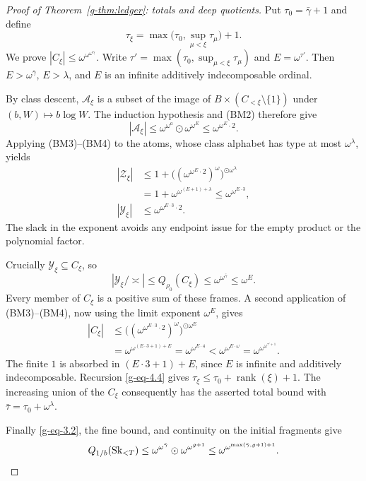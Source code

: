 \documentclass[11pt]{article}
\theoremstyle{definition}
\theoremstyle{remark}
\newcommand{\Sk}{\operatorname{Sk}}
\newcommand{\arch}{\mathrel{\asymp}}
\newcommand{\od}{\mathbin{\odot}}
\newcommand{\Acal}{\mathcal A}
\newcommand{\Ycal}{\mathcal Y}
\newcommand{\Zcal}{\mathcal Z}
\numberwithin{equation}{section}
\begin{document}
\begin{proof}[Proof of Theorem~\ref{g-thm:ledger}: totals and deep quotients]
Put $\tau_0=\bar\gamma+1$ and define
\begin{equation}
 \tau_\xi=\max\bigl(\tau_0,\sup_{\mu<\xi}\tau_\mu\bigr)+1.
 \label{g-eq-4.4}
\end{equation}
We prove $|C_\xi|\le\omega^{\omega^{\omega^{\tau_\xi}}}$.
Write $\tau'=\max(\tau_0,\sup_{\mu<\xi}\tau_\mu)$ and $E=\omega^{\tau'}$.
Then $E>\omega^{\bar\gamma}$, $E>\lambda$, and $E$ is an infinite
additively indecomposable ordinal.

By class descent, $\Acal_\xi$ is a subset of the image of
$B\times(C_{<\xi}\setminus\{1\})$ under $(b,W)\mapsto b\log W$.
The induction hypothesis and (BM2) therefore give
\[
 |\Acal_\xi|
 \le\omega^{\omega^a}\od\omega^{\omega^E}
 \le\omega^{\omega^E\cdot2}.
\]
Applying (BM3)--(BM4) to the atoms, whose class alphabet has type
at most $\omega^\lambda$, yields
\[
 \begin{aligned}
 |\Zcal_\xi|
 &\le1+\bigl((\omega^{\omega^E\cdot2})^\omega
                                 \bigr)^{\od\omega^\lambda}\\
 &=1+\omega^{\omega^{(E+1)+\lambda}}
 \le\omega^{\omega^{E\cdot3}},\\
 |\Ycal_\xi|&\le\omega^{\omega^{E\cdot3}\cdot2}.
 \end{aligned}
\]
The slack in the exponent avoids any endpoint issue for the empty
product or the polynomial factor.

Crucially $\Ycal_\xi\subseteq C_\xi$, so
\begin{equation}
 |\Ycal_\xi/\arch|
 \le Q_{\rho_0}(C_\xi)
 \le\omega^{\omega^{\bar\gamma}}
 \le\omega^E.
 \label{g-eq-4.5}
\end{equation}
Every member of $C_\xi$ is a positive sum of these frames.
A second application of (BM3)--(BM4), now using the limit exponent
$\omega^E$, gives
\[
 \begin{aligned}
 |C_\xi|
 &\le\bigl((\omega^{\omega^{E\cdot3}\cdot2})^\omega
                                      \bigr)^{\od\omega^E}\\
 &=\omega^{\omega^{(E\cdot3+1)+E}}
 =\omega^{\omega^{E\cdot4}}
 <\omega^{\omega^{E\cdot\omega}}
 =\omega^{\omega^{\omega^{\tau'+1}}}.
 \end{aligned}
\]
The finite $1$ is absorbed in $(E\cdot3+1)+E$, since $E$ is
infinite and additively indecomposable.
Recursion \eqref{g-eq-4.4} gives
$\tau_\xi\le\tau_0+\operatorname{rank}(\xi)+1$.
The increasing union of the $C_\xi$ consequently has the asserted
total bound with $\bar\tau=\tau_0+\omega^\lambda$.

Finally \eqref{g-eq-3.2}, the fine bound, and continuity on the initial fragments
give
\[
 Q_{1/b}(\Sk_{<T})
 \le\omega^{\omega^{\bar\gamma}}\od\omega^{\omega^{g+1}}
 \le\omega^{\omega^{\max(\bar\gamma,g+1)+1}}.
 \qedhere
\]
\end{proof}
\end{document}
